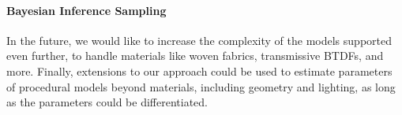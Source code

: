 \paragraph{Bayesian Inference Sampling}
In the future, we would like to increase the complexity of the models supported even further, to handle materials like woven fabrics, transmissive BTDFs, and more. Finally, extensions to our approach could be used to estimate parameters of procedural models beyond materials, including geometry and lighting, as long as the parameters could be differentiated.

